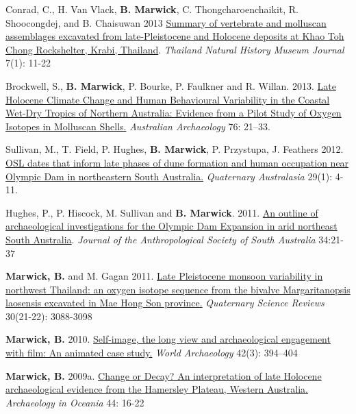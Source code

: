 \documentclass[11pt,article,oneside]{memoir}
\begin{document}
{{{{\ind Conrad, C., H. Van Vlack, \textbf{B. Marwick}, C. Thongcharoenchaikit, R. Shoocongdej, and B. Chaisuwan 2013 \href{http://faculty.washington.edu/bmarwick/PDFs/Conrad_et_al_2013_TNHMJ.pdf}{Summary of vertebrate and molluscan assemblages excavated from late-Pleistocene and Holocene deposits at Khao Toh Chong Rockshelter, Krabi, Thailand}. \textit{Thailand Natural History Museum Journal} 7(1): 11-22

\ind Brockwell, S., \textbf{B. Marwick}, P. Bourke, P. Faulkner and R. Willan. 2013. \href{http://faculty.washington.edu/bmarwick/PDFs/Brockwell_et_al_2013_AA.pdf}{Late Holocene Climate Change and Human Behavioural Variability in the Coastal Wet-Dry Tropics of Northern Australia: Evidence from a Pilot Study of Oxygen Isotopes in Molluscan Shells.} \textit{Australian Archaeology} 76: 21–33.

\ind Sullivan, M., T. Field, P. Hughes, \textbf{B. Marwick}, P. Przystupa, J. Feathers 2012. \href{http://faculty.washington.edu/bmarwick/PDFs/Sullivan_et_al_2012_OSL_dates_ODX.pdf}{OSL dates that inform late phases of dune formation and human occupation near Olympic Dam in northeastern South Australia.} \textit{Quaternary Australasia} 29(1): 4-11.

\ind Hughes, P., P. Hiscock, M. Sullivan and \textbf{B. Marwick}. 2011. \href{http://faculty.washington.edu/bmarwick/PDFs/Hughes_et_al_2011_JASSA.pdf}{An outline of archaeological investigations for the Olympic Dam Expansion in arid northeast South Australia}. \textit{Journal of the Anthropological Society of South Australia} 34:21-37

\ind \textbf{Marwick, B.} and M. Gagan 2011. \href{http://faculty.washington.edu/bmarwick/PDFs/Marwick_and_Gagan_2011_QSR.pdf}{Late Pleistocene monsoon variability in northwest Thailand: an oxygen isotope sequence from the bivalve Margaritanopsis laosensis excavated in Mae Hong Son province.} \textit{Quaternary Science Reviews} 30(21-22): 3088-3098

\ind \textbf{Marwick, B.} 2010. \href{http://faculty.washington.edu/bmarwick/PDFs/Marwick_2010_WA_Wall-E.pdf}{Self-image, the long view and archaeological engagement with film: An animated case study.} \textit{World Archaeology} 42(3): 394–404

\ind \textbf{Marwick, B.} 2009a. \href{http://faculty.washington.edu/bmarwick/PDFs/Marwick_2009_AO_Pilbara.pdf}{Change or Decay? An interpretation of late Holocene archaeological evidence from the Hamersley Plateau, Western Australia.} \textit{Archaeology in Oceania} 44: 16-22

}}}}
\end{document}
